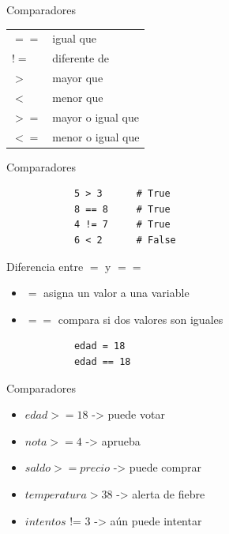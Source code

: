\documentclass{beamer}
\begin{document}
    \begin{frame}{Comparadores}
        \begin{tabular}{m{} m{}}
            $==$ & igual que \\
            $!=$ & diferente de \\
            $>$ & mayor que \\
            $<$ & menor que \\
            $>=$ & mayor o igual que \\
            $<=$ & menor o igual que \\
        \end{tabular}
    \end{frame}

    \begin{frame}[fragile,t]{Comparadores}
        \begin{verbatim}
            5 > 3      # True
            8 == 8     # True
            4 != 7     # True
            6 < 2      # False
        \end{verbatim}
    \end{frame}

    \begin{frame}[fragile,t]{Diferencia entre $=$ y $==$}
        \begin{itemize}
            \item $=$ asigna un valor a una variable
            \item $==$ compara si dos valores son iguales
        \end{itemize}
        \begin{verbatim}
            edad = 18
            edad == 18
        \end{verbatim}
    \end{frame}

    \begin{frame}{Comparadores}
        \begin{itemize}
            \item $edad >= 18$ -> puede votar
            \item $nota >= 4$ -> aprueba
            \item $saldo >= precio$ -> puede comprar
            \item $temperatura > 38$ -> alerta de fiebre
            \item $intentos$ != 3 -> aún puede intentar
        \end{itemize}
    \end{frame}
\end{document}
